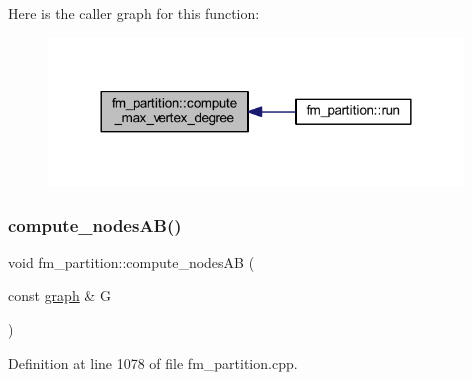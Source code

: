 Here is the caller graph for this function\+:\nopagebreak
\begin{figure}[H]
\begin{center}
\leavevmode
\includegraphics[width=312pt]{classfm__partition_a5d0f409b6b1d554a62d67952236c7ce9_icgraph}
\end{center}
\end{figure}
\mbox{\label{classfm__partition_aaa8f24af3be860bfa42a171c25420c2c}} 
\subsubsection{\texorpdfstring{compute\+\_\+nodes\+A\+B()}{compute\_nodesAB()}}
{\footnotesize\ttfamily void fm\+\_\+partition\+::compute\+\_\+nodes\+AB (\begin{DoxyParamCaption}\item[{const \mbox{\hyperlink{classgraph}{graph}} \&}]{G }\end{DoxyParamCaption})\hspace{0.3cm}{\ttfamily [protected]}}



Definition at line 1078 of file fm\+\_\+partition.\+cpp.


